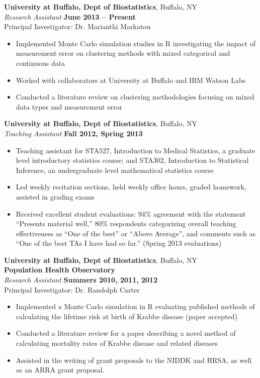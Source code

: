 \documentclass[margin]{res}
\begin{document}
\begin{resume}
 {\bf University at Buffalo, Dept of Biostatistics}, Buffalo, NY\\
 {\it Research Assistant} \hfill {\bf June 2013 -- Present} \\
 Principal Investigator: Dr. Marianthi Markatou 
 \begin{itemize} \itemsep -2pt
  \item Implemented Monte Carlo simulation studies in R investigating the impact of measurement error on clustering methods with mixed categorical and continuous data
  \item Worked with collaborators at University at Buffalo and IBM Watson Labs
  \item Conducted a literature review on clustering methodologies focusing on mixed data types and measurement error
 \end{itemize}

 {\bf University at Buffalo, Dept of Biostatistics}, Buffalo, NY\\
 {\it Teaching Assistant} \hfill {\bf Fall 2012, Spring 2013}
 \begin{itemize} \itemsep -2pt
  \item Teaching assistant for STA527, Introduction to Medical Statistics, a graduate level introductory statistics course; and STA302, Introduction to Statistical Inference, an undergraduate level mathematical statistics course
  \item Led weekly recitation sections, held weekly office hours, graded homework, assisted in grading exams
  \item Received excellent student evaluations: 94\% agreement with the statement ``Presents material well,'' 80\% respondents categorizing overall teaching effectiveness as ``One of the best'' or ``Above Average'', and comments such as ``One of the best TAs I have had so far.'' (Spring 2013 evaluations)
 \end{itemize}
 
 {\bf University at Buffalo, Dept of Biostatistics}, Buffalo, NY\\
 {\bf Population Health Observatory}\\
 {\it Research Assistant} \hfill {\bf Summers 2010, 2011, 2012} \\
 Principal Investigator: Dr. Randolph Carter
 \begin{itemize} \itemsep -2pt
  \item Implemented a Monte Carlo simulation in R evaluating published 
        methods of calculating the lifetime risk at birth of Krabbe disease
        (paper accepted)
  \item Conducted a literature review for a paper describing a novel method 
        of calculating mortality rates of Krabbe disease and related diseases 
  \item Assisted in the writing of grant proposals to the NIDDK and HRSA,
        as well as an ARRA grant proposal.
 \end{itemize}


\end{resume}
\end{document}

